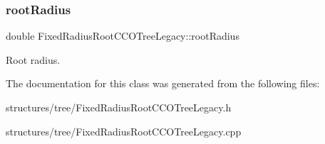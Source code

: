 \subsubsection{\texorpdfstring{root\+Radius}{rootRadius}}
{\footnotesize\ttfamily double Fixed\+Radius\+Root\+C\+C\+O\+Tree\+Legacy\+::root\+Radius\hspace{0.3cm}{\ttfamily [private]}}

Root radius. 

The documentation for this class was generated from the following files\+:\begin{DoxyCompactItemize}
\item 
structures/tree/Fixed\+Radius\+Root\+C\+C\+O\+Tree\+Legacy.\+h\item 
structures/tree/Fixed\+Radius\+Root\+C\+C\+O\+Tree\+Legacy.\+cpp\end{DoxyCompactItemize}
